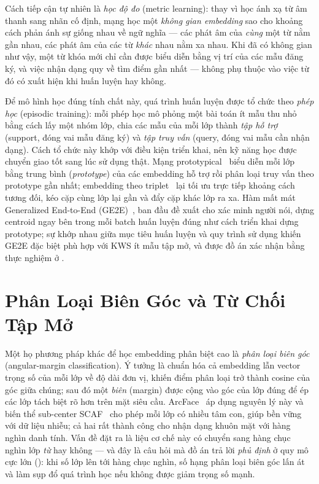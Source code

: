 \documentclass[12pt,a4paper]{report}
\begin{document}
Cách tiếp cận tự nhiên là \emph{học độ đo} (metric learning): thay vì học ánh xạ
từ âm thanh sang nhãn cố định, mạng học một \emph{không gian embedding} sao cho
khoảng cách phản ánh sự giống nhau về ngữ nghĩa --- các phát âm của \emph{cùng}
một từ nằm gần nhau, các phát âm của các từ \emph{khác} nhau nằm xa nhau. Khi đã
có không gian như vậy, một từ khóa mới chỉ cần được biểu diễn bằng vị trí của các
mẫu đăng ký, và việc nhận dạng quy về tìm điểm gần nhất --- không phụ thuộc vào
việc từ đó có xuất hiện khi huấn luyện hay không.

Để mô hình học đúng tính chất này, quá trình huấn luyện được tổ chức theo
\emph{phép học} (episodic training): mỗi phép học mô phỏng một bài toán ít mẫu thu
nhỏ bằng cách lấy một nhóm lớp, chia các mẫu của mỗi lớp thành \emph{tập hỗ trợ}
(support, đóng vai mẫu đăng ký) và \emph{tập truy vấn} (query, đóng vai mẫu cần
nhận dạng). Cách tổ chức này khớp với điều kiện triển khai, nên kỹ năng học được
chuyển giao tốt sang lúc sử dụng thật. Mạng prototypical~\cite{snell2017prototypical}
biểu diễn mỗi lớp bằng trung bình (\emph{prototype}) của các embedding hỗ trợ rồi
phân loại truy vấn theo prototype gần nhất; embedding theo triplet~\cite{schroff2015facenet}
lại tối ưu trực tiếp khoảng cách tương đối, kéo cặp cùng lớp lại gần và đẩy cặp
khác lớp ra xa. Hàm mất mát Generalized End-to-End (GE2E)~\cite{wan2018ge2e}, ban
đầu đề xuất cho xác minh người nói, dựng centroid ngay bên trong mỗi batch huấn
luyện đúng như cách triển khai dựng prototype; sự khớp nhau giữa mục tiêu huấn
luyện và quy trình sử dụng khiến GE2E đặc biệt phù hợp với KWS ít mẫu tập mở, và
được đồ án xác nhận bằng thực nghiệm ở .

\section{Phân Loại Biên Góc và Từ Chối Tập Mở}\label{sec:arc-bg}

Một họ phương pháp khác để học embedding phân biệt cao là \emph{phân loại biên
góc} (angular-margin classification). Ý tưởng là chuẩn hóa cả embedding lẫn vector
trọng số của mỗi lớp về độ dài đơn vị, khiến điểm phân loại trở thành cosine của
góc giữa chúng; sau đó một \emph{biên} (margin) được cộng vào góc của lớp đúng để
ép các lớp tách biệt rõ hơn trên mặt siêu cầu. ArcFace~\cite{deng2019arcface} áp
dụng nguyên lý này và biến thể sub-center SCAF~\cite{deng2020subcenter} cho phép
mỗi lớp có nhiều tâm con, giúp bền vững với dữ liệu nhiễu; cả hai rất thành công
cho nhận dạng khuôn mặt với hàng nghìn danh tính. Vấn đề đặt ra là liệu cơ
chế này có chuyển sang hàng chục nghìn lớp \emph{từ} hay không --- và đây là câu
hỏi mà đồ án trả lời \emph{phủ định} ở quy mô cực lớn (): khi số
lớp lên tới hàng chục nghìn, số hạng phân loại biên góc lấn át và làm sụp đổ quá
trình học nếu không được giảm trọng số mạnh.
\end{document}

